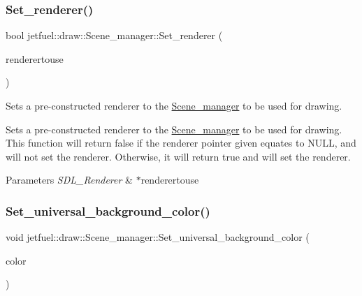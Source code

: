 \subsubsection{\texorpdfstring{Set\+\_\+renderer()}{Set\_renderer()}}
{\footnotesize\ttfamily bool jetfuel\+::draw\+::\+Scene\+\_\+manager\+::\+Set\+\_\+renderer (\begin{DoxyParamCaption}\item[{S\+D\+L\+\_\+\+Renderer $\ast$}]{renderertouse }\end{DoxyParamCaption})}



Sets a pre-\/constructed renderer to the \hyperlink{classjetfuel_1_1draw_1_1Scene__manager}{Scene\+\_\+manager} to be used for drawing. 

Sets a pre-\/constructed renderer to the \hyperlink{classjetfuel_1_1draw_1_1Scene__manager}{Scene\+\_\+manager} to be used for drawing. This function will return false if the renderer pointer given equates to N\+U\+LL, and will not set the renderer. Otherwise, it will return true and will set the renderer.


\begin{DoxyParams}{Parameters}
{\em S\+D\+L\+\_\+\+Renderer} & $\ast$renderertouse \\
\hline
\end{DoxyParams}
\mbox{\label{classjetfuel_1_1draw_1_1Scene__manager_afb917b4617be734b81c66c3618eb16dd}} 
\subsubsection{\texorpdfstring{Set\+\_\+universal\+\_\+background\+\_\+color()}{Set\_universal\_background\_color()}}
{\footnotesize\ttfamily void jetfuel\+::draw\+::\+Scene\+\_\+manager\+::\+Set\+\_\+universal\+\_\+background\+\_\+color (\begin{DoxyParamCaption}\item[{\hyperlink{classjetfuel_1_1draw_1_1Color}{Color}}]{color }\end{DoxyParamCaption})\hspace{0.3cm}{\ttfamily [inline]}}



